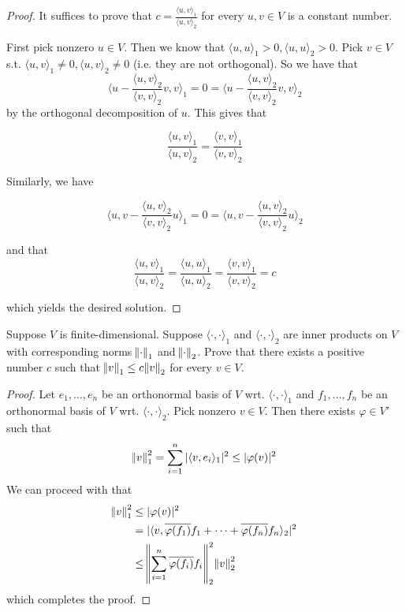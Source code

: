 \documentclass{extarticle}
\begin{document}
\begin{proof}

It suffices to prove that \(c = \frac{\langle u,v \rangle_1}{\langle u,v \rangle_2}\) for every 
\(u, v \in V\) is a constant number.

First pick nonzero \(u \in V\). Then we know that \(\langle u,u \rangle_1 > 0, \langle u,u \rangle_2 > 0\).
Pick \(v \in V\) s.t. \(\langle u,v \rangle_1 \neq 0, \langle u,v \rangle_2 \neq 0\) (i.e. they are not 
orthogonal). So we have that 
\[ \langle u - \frac{\langle u,v \rangle_2}{\langle v,v \rangle_2}v, v \rangle_1 = 0  = 
\langle u - \frac{\langle u,v \rangle_2}{\langle v,v \rangle_2}v, v \rangle_2 \]
by the orthogonal decomposition of \(u\). This gives that 

\[\frac{\langle u,v \rangle_1}{\langle u,v \rangle_2} = \frac{\langle v,v \rangle_1}{\langle v,v \rangle_2}\]

Similarly, we have 

\[ \langle u , v - \frac{\langle u,v \rangle_2}{\langle v,v \rangle_2}u \rangle_1 = 0  = 
\langle u , v - \frac{\langle u,v \rangle_2}{\langle v,v \rangle_2}u \rangle_2 \]

and that 
\[\frac{\langle u,v \rangle_1}{\langle u,v \rangle_2} = \frac{\langle u,u \rangle_1}{\langle u,u \rangle_2} 
= \frac{\langle v,v \rangle_1}{\langle v,v \rangle_2} = c\]

which yields the desired solution. 

\end{proof}



\begin{problem}{16}
    Suppose \(V\) is finite-dimensional. Suppose \(\langle \cdot,\cdot \rangle_1\) and 
    \(\langle \cdot,\cdot \rangle_2\) are inner products on \(V\) with corresponding norms 
    \(\norm{\cdot}_1\) and \(\norm{\cdot}_2\). Prove that there exists a positive number \(c\)
    such that \(\norm{v}_1 \leq c \norm{v}_2\) for every \(v \in V\).
\end{problem}

\begin{proof}
Let \(e_1, \ldots, e_n\) be an orthonormal basis of \(V\) wrt. \(\langle \cdot,\cdot \rangle_1\) 
and \(f_1, \ldots, f_n\) be an orthonormal basis of \(V\) wrt. \(\langle \cdot,\cdot \rangle_2\). Pick 
nonzero \( v \in V\). Then there exists \(\varphi \in V'\) such that 
\[ \norm{v}_1^2 = \sum_{i=1}^{n} |\langle v,e_i \rangle_1|^2 \leq |\varphi(v)|^2\]
We can proceed with that 
\begin{align*}
    \norm{v}_1^2 
    &\leq |\varphi(v)|^2  \\ 
    &= | \langle v, \overline{\varphi(f_1)}f_1 + \cdots + \overline{\varphi(f_n)}f_n \rangle_2  |^2 \\ 
    &\leq  \norm{\sum_{i=1}^{n} \overline{\varphi(f_i)}f_i}_2^2  \norm{v}_2^2 
\end{align*}
which completes the proof.
\end{proof}
\end{document}
